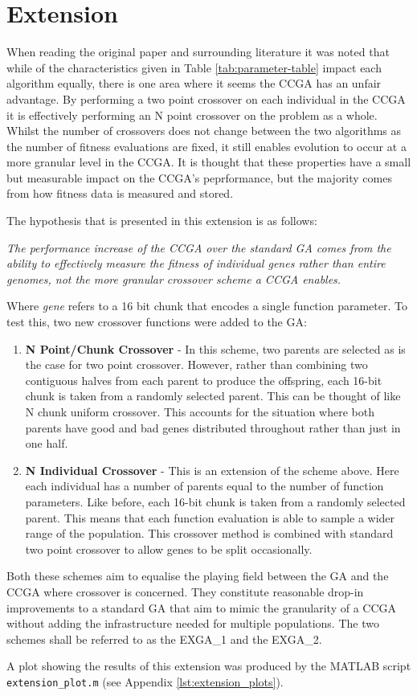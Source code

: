 \section{Extension} \label{sec:extension}

When reading the original paper and surrounding literature it was noted that while of the characteristics given in Table \ref{tab:parameter-table} impact each algorithm equally, there is one area where it seems the CCGA has an unfair advantage.
By performing a two point crossover on each individual in the CCGA it is effectively performing an N point crossover on the problem as a whole. 
Whilst the number of crossovers does not change between the two algorithms as the number of fitness evaluations are fixed, it still enables evolution to occur at a more granular level in the CCGA.
It is thought that these properties have a small but measurable impact on the CCGA's peprformance, but the majority comes from how fitness data is measured and stored.


The hypothesis that is presented in this extension is as follows:

\emph{The performance increase of the CCGA over the standard GA comes from the ability to effectively measure the fitness of individual genes rather than entire genomes, not the more granular crossover scheme a CCGA enables.} 

Where \textit{gene} refers to a 16 bit chunk that encodes a single function parameter.
To test this, two new crossover functions were added to the GA:
\begin{enumerate}
    \item \textbf{N Point/Chunk Crossover} - In this scheme, two parents are selected as is the case for two point crossover. However, rather than combining two contiguous halves from each parent to produce the offspring, each 16-bit chunk is taken from a randomly selected parent. 
    This can be thought of like N chunk uniform crossover.
    This accounts for the situation where both parents have good and bad genes distributed throughout rather than just in one half.

    \item \textbf{N Individual Crossover} -  This is an extension of the scheme above.
    Here each individual has a number of parents equal to the number of function parameters.
    Like before, each 16-bit chunk is taken from a randomly selected parent.
    This means that each function evaluation is able to sample a wider range of the population.
    This crossover method is combined with standard two point crossover to allow genes to be split occasionally.
\end{enumerate}

Both these schemes aim to equalise the playing field between the GA and the CCGA where crossover is concerned.
They constitute reasonable drop-in improvements to a standard GA that aim to mimic the granularity of a CCGA without adding the infrastructure needed for multiple populations.
The two schemes shall be referred to as the EXGA\_1 and the EXGA\_2.

A plot showing the results of this extension was produced by the MATLAB script \\
\texttt{extension\_plot.m} (see Appendix \ref{lst:extension_plots}).
